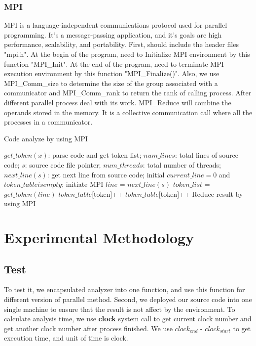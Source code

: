 \documentclass{acm_proc_article-sp}
\begin{document}
\subsubsection{MPI}
MPI is a language-independent communications protocol used for parallel programming. It's a message-passing application, and it's goals are high performance, scalability, and portability. 
First, should include the header files "mpi.h". At the begin of the program, need to Initialize MPI environment by this function "MPI\_Init". At the end of the program, need to terminate MPI execution environment by this function "MPI\_Finalize()".
Also, we use MPI\_Comm\_size to determine the size of the group associated with a communicator and MPI\_Comm\_rank to return the rank of calling process. After different parallel process deal with its work. MPI\_Reduce will combine the operands stored in the memory. It is a collective communication call where all the processes in a communicator.
\begin{algorithm}[h]
\caption{Code analyze by using MPI}
\begin{algorithmic}[1]
\Require
$get\_token(x)$: parse code and get token list;
$num\_lines$: total lines of source code;
$s$: source code file pointer;
$num\_threads$: total number of threads;
$next\_line(s)$: get next line from source code;
			\State initial $current\_line=0$ and $token\_table is empty$;
			\State initiate MPI
            \State $line$ = $next\_line(s)$
			\State $token\_list$ = $get\_token(line)$
					\State $token\_table[$token]++
				\EndFor
			\EndIf
					\State $token\_table[$token]++
				\EndFor
			\EndIf
			\State Reduce result by using MPI
		\end{algorithmic}
\end{algorithm}


\section{Experimental Methodology}
\subsection{Test}
	To test it, we encapsulated analyzer into one function, and use this function for different
	version of parallel method.
	Second, we deployed our source code into one single machine to ensure that the result
	is not affect by the environment.
	To calculate analysis time, we use \textbf{clock} system call to get current clock number
	and get another clock number after process finished. We use \textit{$clock_{end}$} - \textit{$clock_{start}$}
	to get execution time, and unit of time is clock.
\end{document}
